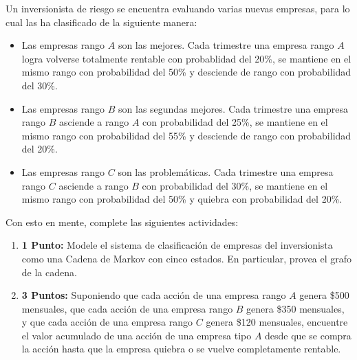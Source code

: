 \documentclass[ a4paper, twoside, 11pt]{article}
\begin{document}
\begin{problem}
Un inversionista de riesgo se encuentra evaluando varias nuevas empresas, para lo cual las ha clasificado de la siguiente manera: 
\begin{itemize}
\item Las empresas rango $A$ son las mejores. Cada trimestre una empresa rango $A$ logra volverse totalmente rentable con probablidad del 20\%, se mantiene en el mismo rango con probabilidad del 50\% y desciende de rango con probabilidad del 30\%. 
\item Las empresas rango $B$ son las segundas mejores. Cada trimestre una empresa rango $B$ \linebreak asciende a rango $A$ con probabilidad del 25\%, se mantiene en el mismo rango con probabilidad del 55\% y desciende de rango con probabilidad del 20\%. 
\item Las empresas rango $C$ son las problem\'aticas. Cada trimestre una empresa rango $C$ asciende a rango $B$ con probabilidad del 30\%, se mantiene en el mismo rango con probabilidad del 50\% y quiebra con probabilidad del 20\%. 
\end{itemize}

Con esto en mente, complete las siguientes actividades: 
\begin{enumerate}[label=\textbf{\alph*)}]
\item \textbf{1 Punto:} Modele el sistema de clasificaci\'on de empresas del inversionista como una Cadena de Markov con cinco estados. En particular, provea el grafo de la cadena. 
\item \textbf{3 Puntos:} Suponiendo que cada acci\'on de una empresa rango $A$ genera \$500 mensuales, que cada acci\'on de una empresa rango $B$ genera \$350 mensuales, y que cada acci\'on de una empresa rango $C$ genera \$120 mensuales, encuentre el valor acumulado de una acci\'on de una empresa tipo $A$ desde que se compra la acci\'on hasta que la empresa quiebra o se vuelve completamente rentable. 
\end{enumerate}

\end{problem}
\fullskip
\end{document}
